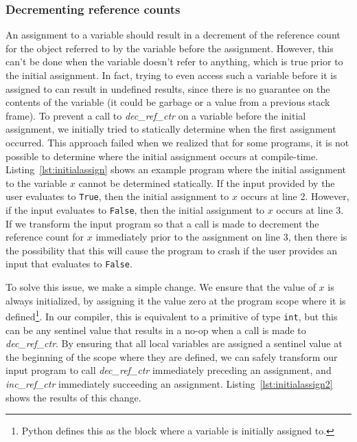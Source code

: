 \documentclass{sigplanconf}
\newcommand{\avariable}[1]{\ensuremath{#1}}
\newcommand{\aliteral}[1]{\texttt{#1}}
\newcommand{\afunction}[1]{\textit{#1}}
\newcommand{\atype}[1]{\texttt{#1}}
\begin{document}
\subsubsection{Decrementing reference counts}
An assignment to a variable should result in a decrement of the reference count for the object referred to by the variable before the assignment.  However, this can't be done when the variable doesn't refer to anything, which is true prior to the initial assignment.  In fact, trying to even access such a variable before it is assigned to can result in undefined results, since there is no guarantee on the contents of the variable (it could be garbage or a value from a previous stack frame).   To prevent a call to \afunction{dec\_ref\_ctr} on a variable before the initial assignment, we initially tried to statically determine when the first assignment occurred.  This approach failed when we realized that for some programs, it is not possible to determine where the initial assignment occurs at compile-time.  Listing~\ref{lst:initialassign} shows an example program where the initial assignment to the variable \avariable{x} cannot be determined statically.  If the input provided by the user evaluates to \aliteral{True}, then the initial assignment to $x$ occurs at line 2.  However, if the input evaluates to \aliteral{False}, then the initial assignment to \avariable{x} occurs at line 3.  If we transform the input program so that a call is made to decrement the reference count for \avariable{x} immediately prior to the assignment on line 3, then there is the possibility that this will cause the program to crash if the user provides an input that evaluates to \aliteral{False}.

To solve this issue, we make a simple change.  We ensure that the value of \avariable{x} is always initialized, by assigning it the value zero at the program scope where it is defined\footnote{Python defines this as the block where a variable is initially assigned to.}.  In our compiler, this is equivalent to a primitive of type \atype{int}, but this can be any sentinel value that results in a no-op when a call is made to \afunction{dec\_ref\_ctr}.  By ensuring that all local variables are assigned a sentinel value at the beginning of the scope where they are defined, we can safely transform our input program to call \afunction{dec\_ref\_ctr} immediately preceding an assignment, and \afunction{inc\_ref\_ctr} immediately succeeding an assignment.  Listing~\ref{lst:initialassign2} shows the results of this change.
\end{document}
